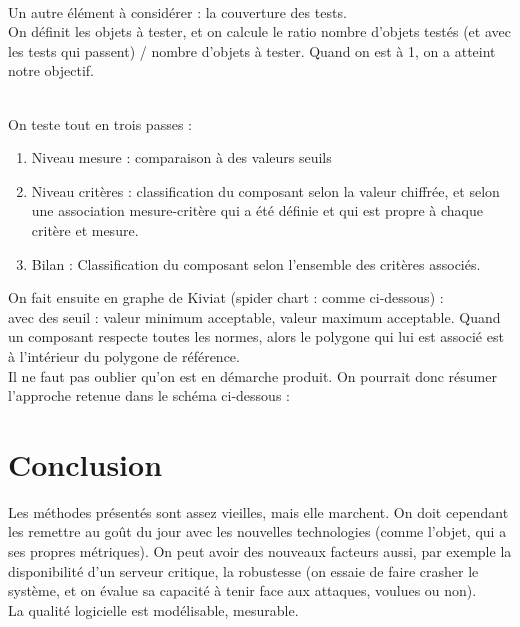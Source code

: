 \hfill\\

Un autre élément à considérer : la couverture des tests.\\
On définit les objets à tester, et on calcule le ratio nombre d’objets testés (et avec les tests qui passent) / nombre d’objets à tester. Quand on est à 1, on a atteint notre objectif.

\hfill\\

On teste tout en trois passes :
\begin{enumerate}
\item Niveau mesure : comparaison à des valeurs seuils
\item Niveau critères : classification du composant selon la valeur chiffrée, et selon une association mesure-critère qui a été définie et qui est propre à chaque critère et mesure.
\item Bilan : Classification du composant selon l’ensemble des critères associés.
\end{enumerate}


On fait ensuite en graphe de Kiviat (spider chart : comme ci-dessous) :\\
avec des seuil : valeur minimum acceptable, valeur maximum acceptable. Quand un composant respecte toutes les normes, alors le polygone qui lui est associé est à l’intérieur du polygone de référence.
\hfill\\
Il ne faut pas oublier qu’on est en démarche produit. On pourrait donc résumer l’approche retenue dans le schéma ci-dessous :\\


\section{Conclusion}

Les méthodes présentés sont assez vieilles, mais elle marchent. On doit cependant les remettre au goût du jour avec les nouvelles technologies (comme l’objet, qui a ses propres métriques).
On peut avoir des nouveaux facteurs aussi, par exemple la disponibilité d’un serveur critique, la robustesse (on essaie de faire crasher le système, et on évalue sa capacité à tenir face aux attaques, voulues ou non).\\

La qualité logicielle est modélisable, mesurable.
